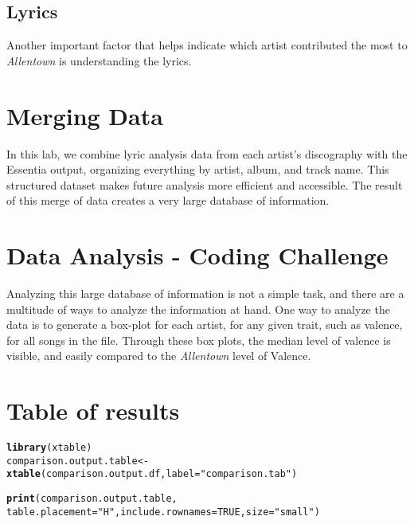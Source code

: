 \documentclass{article}\usepackage[]{graphicx}\usepackage[]{xcolor}
\makeatletter
\newcommand{\hlnum}[1]{\textcolor[rgb]{0.686,0.059,0.569}{#1}}%
\newcommand{\hlsng}[1]{\textcolor[rgb]{0.192,0.494,0.8}{#1}}%
\newcommand{\hldef}[1]{\textcolor[rgb]{0.345,0.345,0.345}{#1}}%
\newcommand{\hlkwb}[1]{\textcolor[rgb]{0.69,0.353,0.396}{#1}}%
\newcommand{\hlkwc}[1]{\textcolor[rgb]{0.333,0.667,0.333}{#1}}%
\newcommand{\hlkwd}[1]{\textcolor[rgb]{0.737,0.353,0.396}{\textbf{#1}}}%
\newenvironment{kframe}{%
 \def\at@end@of@kframe{}%
 \ifinner\ifhmode%
  \def\at@end@of@kframe{\end{minipage}}%
  \begin{minipage}{\columnwidth}%
 \fi\fi%
 \def\FrameCommand##1{\hskip\@totalleftmargin \hskip-\fboxsep
 \colorbox{shadecolor}{##1}\hskip-\fboxsep
     \hskip-\linewidth \hskip-\@totalleftmargin \hskip\columnwidth}%
 \MakeFramed {\advance\hsize-\width
   \@totalleftmargin\z@ \linewidth\hsize
   \@setminipage}}%
 {\par\unskip\endMakeFramed%
 \at@end@of@kframe}
\newenvironment{knitrout}{}{} %
\makeatother
\begin{document}
\begin{multicols}{2}
\subsection{Lyrics}
Another important factor that helps indicate which artist contributed the most to  \emph{Allentown} is understanding the lyrics.

\section{Merging Data}
In this lab, we combine lyric analysis data from each artist’s discography with the Essentia output, organizing everything by artist, album, and track name. This structured dataset makes future analysis more efficient and accessible. The result of this merge of data creates a very large database of information.

\section{Data Analysis - Coding Challenge}
Analyzing this large database of information is not a simple task, and there are a multitude of ways to analyze the information at hand. One way to analyze the data is to generate a box-plot for each artist, for any given trait, such as valence, for all songs in the file. Through these box plots, the median level of valence is visible, and easily compared to the \emph{Allentown} level of Valence. 

\section{Table of results}
\begin{knitrout}\scriptsize
{}\color{fgcolor}\begin{kframe}
\begin{alltt}
\hlkwd{library}\hldef{(xtable)}
\hldef{comparison.output.table} \hlkwb{<-} \hlkwd{xtable}\hldef{(comparison.output.df,} \hlkwc{label}\hldef{=}\hlsng{"comparison.tab"}\hldef{)}
\end{alltt}


{\ttfamily\noindent\bfseries\color{errorcolor}{\#\# Error: object 'comparison.output.df' not found}}\begin{alltt}
\hlkwd{print}\hldef{(comparison.output.table,}
      \hlkwc{table.placement}\hldef{=} \hlsng{"H"}\hldef{,} \hlkwc{include.rownames}\hldef{=}\hlnum{TRUE}\hldef{,} \hlkwc{size}\hldef{=}\hlsng{"small"}\hldef{)}
\end{alltt}


{\ttfamily\noindent\bfseries\color{errorcolor}{\#\# Error: object 'comparison.output.table' not found}}\end{kframe}
\end{knitrout}

\end{multicols}
\end{document}

